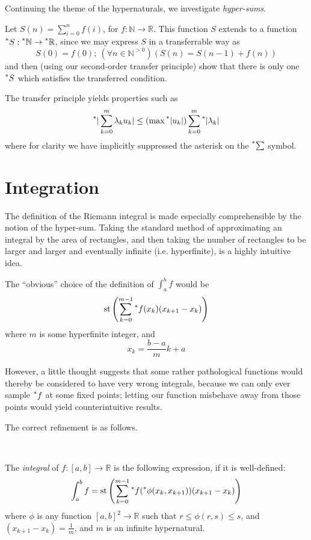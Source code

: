 \documentclass[11pt]{amsart}
\theoremstyle{remark}
\newcommand{\st}{\mathrm{st}}
\newcommand{\hyp}[1][\mathbb{R}]{\prescript{*}{}{#1}}
\begin{document}
Continuing the theme of the hypernaturals, we investigate \emph{hyper-sums}.

Let $S(n) = \sum_{i=0}^n f(i)$, for $f: \mathbb{N} \to \mathbb{R}$.
This function $S$ extends to a function $\hyp[S]: \hyp[\mathbb{N}] \to \hyp$, since we may express $S$ in a transferrable way as $$S(0) = f(0); \ (\forall n \in \mathbb{N}^{>0})(S(n) = S(n-1) + f(n))$$
and then (using our second-order transfer principle) show that there is only one $\hyp[S]$ which satisfies the transferred condition.

The transfer principle yields properties such as \begin{equation}\label{sums} \hyp[|] \sum_{k=0}^m \lambda_k u_k| \leq (\max \hyp[|] u_k|) \sum_{k=0}^m \hyp[|] \lambda_k|\end{equation}
where for clarity we have implicitly suppressed the asterisk on the $\hyp[\sum]$ symbol.

\section{Integration}

The definition of the Riemann integral is made especially comprehensible by the notion of the hyper-sum.
Taking the standard method of approximating an integral by the area of rectangles, and then taking the number of rectangles to be larger and larger and eventually infinite (i.e. hyperfinite), is a highly intuitive idea.

The ``obvious'' choice of the definition of $\int_a^b f$ would be $$\st \left( \sum_{k=0}^{m-1} \hyp[f](x_k) (x_{k+1}-x_k)\right)$$
where $m$ is some hyperfinite integer, and $$x_k = \frac{b-a}{m} k + a$$

However, a little thought suggests that some rather pathological functions would thereby be considered to have very wrong integrals, because we can only ever sample $\hyp[f]$ at some fixed points; letting our function misbehave away from those points would yield counterintuitive results.

The correct refinement is as follows.

\

\begin{defn}
The \emph{integral} of $f: [a,b] \to \mathbb{R}$ is the following expression, if it is well-defined:
$$\int_a^b f = \st \left( \sum_{k=0}^{m-1} \hyp[f](\hyp[\phi](x_k, x_{k+1})) (x_{k+1}-x_k) \right)$$
where $\phi$ is any function $[a, b]^2 \to \mathbb{R}$ such that $r \leq \phi(r, s) \leq s$, and $(x_{k+1} - x_k) = \frac{1}{m}$, and $m$ is an infinite hypernatural.
\end{defn}
\end{document}
